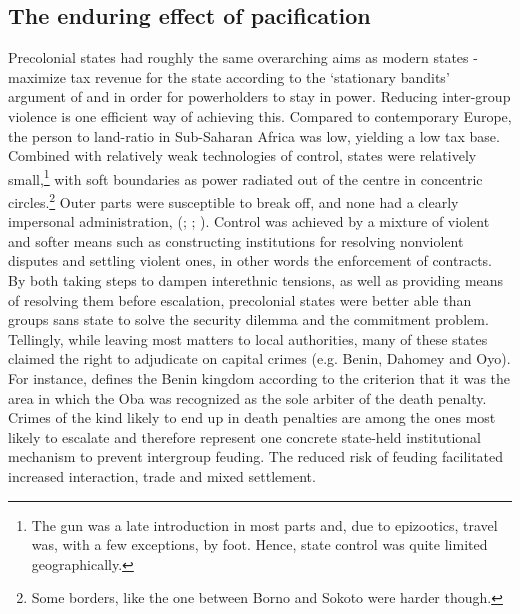 \subsection{The enduring effect of pacification} 
\label{The enduring effect of pacification}

Precolonial states had roughly the same overarching aims as modern states -
maximize tax revenue for the state according to the `stationary bandits'
argument of \citet{tilly_1985} and \citet{Olson1993} in order for powerholders
to stay in power. Reducing inter-group violence is one efficient way of
achieving this. Compared to contemporary Europe, the person to land-ratio in
Sub-Saharan Africa was low, yielding a low tax base. Combined with relatively
weak technologies of control, states were relatively small,\footnote{The gun was
a late introduction in most parts and, due to epizootics, travel was, with a few
exceptions, by foot. Hence, state control was quite limited geographically.}
with soft boundaries as power radiated out of the centre in concentric
circles.\footnote{Some borders, like the one between Borno and Sokoto were
harder though.} Outer parts were susceptible to break off, and none had a
clearly impersonal administration, (\citealp[20]{englebert2013inside};
\citealp{Herbst2014}; \citealp[135]{tibebu1995making}). Control was achieved by
a mixture of violent and softer means such as constructing institutions for
resolving nonviolent disputes and settling violent ones, in other words the
enforcement of contracts. By both taking steps to dampen interethnic tensions,
as well as providing means of resolving them before escalation, precolonial
states were better able than groups sans state to solve the security dilemma and
the commitment problem. Tellingly, while leaving most matters to local
authorities, many of these states claimed the right to adjudicate on capital
crimes (e.g. Benin, Dahomey and Oyo). For instance,
\citet[3-4]{BradburyR.E1970TBka} defines the Benin kingdom according to the
criterion that it was the area in which the Oba was recognized as the sole
arbiter of the death penalty. Crimes of the kind likely to end up in death
penalties are among the ones most likely to escalate and therefore represent
one concrete state-held institutional mechanism to prevent intergroup feuding.
The reduced risk of feuding facilitated increased interaction, trade and mixed
settlement.


